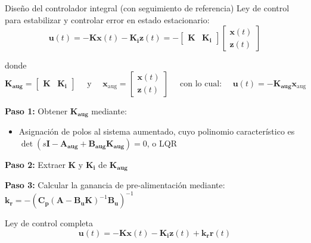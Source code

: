 \documentclass{beamer}
\begin{document}
\begin{frame}{Diseño del controlador integral (con seguimiento de referencia)}
    Ley de control para estabilizar y controlar error en estado estacionario: 
    $$\mathbf{u}(t) = -\mathbf{K}\mathbf{x}(t) - \mathbf{K_i}\mathbf{z}(t) = -\begin{bmatrix}\mathbf{K} & \mathbf{K_i}\end{bmatrix}\begin{bmatrix}\mathbf{x}(t) \\ \mathbf{z}(t)\end{bmatrix}$$
    
    donde
    $$ \mathbf{K_{\text{aug}}} = \begin{bmatrix}\mathbf{K} & \mathbf{K_i}\end{bmatrix} \quad \text{ y }  \quad \mathbf{x}_\text{aug} = \begin{bmatrix}\mathbf{x}(t) \\ \mathbf{z}(t)\end{bmatrix} \quad \text{ con lo cual: } \quad \mathbf{u}(t) = -\mathbf{K_{\text{aug}}}\mathbf{x}_\text{aug}$$
    
    \textbf{Paso 1:} Obtener $\mathbf{K_{\text{aug}}}$ mediante:
    \begin{itemize}
        \item Asignación de polos al sistema aumentado, cuyo polinomio característico es $\det(s\mathbf{I} - \mathbf{A_{\text{aug}}} + \mathbf{B_{\text{aug}}}\mathbf{K_{\text{aug}}}) = 0$, o LQR
    \end{itemize}

    \textbf{Paso 2:} Extraer $\mathbf{K}$ y $\mathbf{K_i}$ de $\mathbf{K_{\text{aug}}}$

    \textbf{Paso 3:} Calcular la ganancia de pre-alimentación mediante: $\mathbf{k_r} =  -(\mathbf{C_p} (\mathbf{A} - \mathbf{B_u K})^{-1} \mathbf{B_u})^{-1}$

    \begin{block}{Ley de control completa}
        $$\mathbf{u}(t) = -\mathbf{K x}(t) - \mathbf{K_i z}(t) + \mathbf{k_r r}(t)$$
    \end{block}
    

\end{frame}


\end{document}

